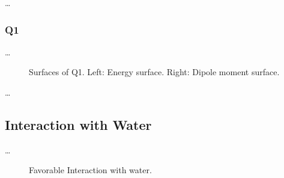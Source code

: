 \ldots
\subsubsection{Q1}

\ldots
\begin{figure}[ht!]
  \centering
  \begin{minipage}[]{0.49\textwidth}
    \centering
    \footnotesize
    
  \end{minipage}%
  \begin{minipage}[]{0.47\textwidth}
    \centering
    \small
    
  \end{minipage}
  \begin{minipage}[]{0.49\textwidth}
    \centering
    \small
    
  \end{minipage}%
  \begin{minipage}[]{0.47\textwidth}
    \centering
    \small
    
  \end{minipage}
  \label{fig:Q1_surf}
  \caption[Surfaces of Q1]{Surfaces of Q1. Left: Energy surface. Right: Dipole moment surface.}
\end{figure}

\iffalse
\begin{figure}[hb!]
  \centering
  \begin{minipage}[]{0.49\textwidth}
    \centering
    \small
    
  \end{minipage}%
  \begin{minipage}[]{0.47\textwidth}
    \centering
    \small
    
  \end{minipage}
  \label{fig:Q1_surf}
  \caption[Surfaces of Q1]{Surfaces of Q1. Left: Energy surface. Right: Dipole moment surface.}
\end{figure}
\subsection{A Simple Cluster Model}
\fi
\ldots

\subsection{Interaction with Water}
\ldots
\begin{figure}[th!]
    \centering
    
    \caption[Short caption for Table of Figures]{Favorable Interaction with water.}
    \label{fig:H2O_fav}
\end{figure}

